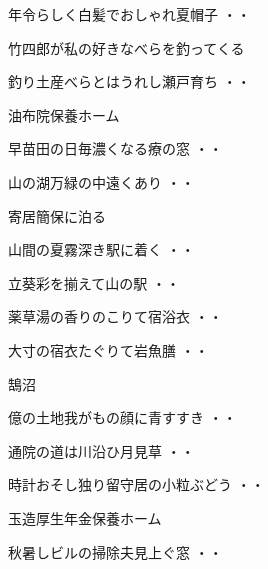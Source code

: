 \vspace{0.6cm}
\begin{shiika}年令らしく白髪でおしゃれ夏帽子
\hfill{・・}\end{shiika}
\vspace{0.6cm}
竹四郎が私の好きなべらを釣ってくる
\begin{shiika}釣り土産べらとはうれし瀬戸育ち
\hfill{・・}\end{shiika}
\vspace{0.6cm}
油布院保養ホーム
\begin{shiika}早苗田の日毎濃くなる療の窓
\hfill{・・}\end{shiika}
\begin{shiika}山の湖万緑の中遠くあり
\hfill{・・}\end{shiika}
\vspace{0.6cm}
寄居簡保に泊る
\begin{shiika}山間の夏霧深き駅に着く
\hfill{・・}\end{shiika}
\begin{shiika}立葵彩を揃えて山の駅
\hfill{・・}\end{shiika}
\begin{shiika}薬草湯の香りのこりて宿浴衣
\hfill{・・}\end{shiika}
\begin{shiika}大寸の宿衣たぐりて岩魚膳
\hfill{・・}\end{shiika}
\vspace{0.6cm}
鵠沼
\begin{shiika}億の土地我がもの顔に青すすき
\hfill{・・}\end{shiika}
\begin{shiika}通院の道は川沿ひ月見草
\hfill{・・}\end{shiika}
\begin{shiika}時計おそし独り留守居の小粒ぶどう
\hfill{・・}\end{shiika}
\vspace{0.6cm}
玉造厚生年金保養ホーム
\begin{shiika}秋暑しビルの掃除夫見上ぐ窓
\hfill{・・}\end{shiika}
